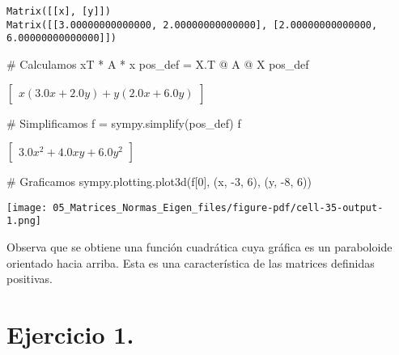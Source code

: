 \documentclass[
  letterpaper,
  DIV=11,
  numbers=noendperiod]{scrreprt}
\newenvironment{Shaded}{\begin{snugshade}}{\end{snugshade}}
\newcommand{\CommentTok}[1]{\textcolor[rgb]{0.37,0.37,0.37}{#1}}
\newcommand{\DecValTok}[1]{\textcolor[rgb]{0.68,0.00,0.00}{#1}}
\newcommand{\NormalTok}[1]{\textcolor[rgb]{0.00,0.23,0.31}{#1}}
\newcommand{\OperatorTok}[1]{\textcolor[rgb]{0.37,0.37,0.37}{#1}}
\begin{document}
\begin{verbatim}
Matrix([[x], [y]])
Matrix([[3.00000000000000, 2.00000000000000], [2.00000000000000, 6.00000000000000]])
\end{verbatim}

\begin{Shaded}
\begin{Highlighting}[]
\CommentTok{\# Calculamos xT * A * x}
\NormalTok{pos\_def }\OperatorTok{=}\NormalTok{ X.T }\OperatorTok{@}\NormalTok{ A }\OperatorTok{@}\NormalTok{ X}
\NormalTok{pos\_def}
\end{Highlighting}
\end{Shaded}

$\displaystyle \left[\begin{matrix}x \left(3.0 x + 2.0 y\right) + y \left(2.0 x + 6.0 y\right)\end{matrix}\right]$

\begin{Shaded}
\begin{Highlighting}[]
\CommentTok{\# Simplificamos}
\NormalTok{f }\OperatorTok{=}\NormalTok{ sympy.simplify(pos\_def)}
\NormalTok{f}
\end{Highlighting}
\end{Shaded}

$\displaystyle \left[\begin{matrix}3.0 x^{2} + 4.0 x y + 6.0 y^{2}\end{matrix}\right]$

\begin{Shaded}
\begin{Highlighting}[]
\CommentTok{\# Graficamos}
\NormalTok{sympy.plotting.plot3d(f[}\DecValTok{0}\NormalTok{], (x, }\OperatorTok{{-}}\DecValTok{3}\NormalTok{, }\DecValTok{6}\NormalTok{), (y, }\OperatorTok{{-}}\DecValTok{8}\NormalTok{, }\DecValTok{6}\NormalTok{))}
\end{Highlighting}
\end{Shaded}

\texttt{[image: 05\_Matrices\_Normas\_Eigen\_files/figure-pdf/cell-35-output-1.png]}

Observa que se obtiene una función cuadrática cuya gráfica es un
paraboloide orientado hacia arriba. Esta es una característica de las
matrices definidas positivas.

\section{\texorpdfstring{\textbf{Ejercicio
1.}}{Ejercicio 1.}}\label{ejercicio-1.-4}
\end{document}
